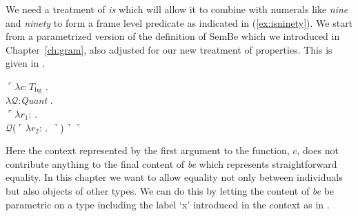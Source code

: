 We need a treatment of \textit{is} which will allow it to
combine with numerals like \textit{nine} and \textit{ninety} to form a
frame level predicate as indicated in (\ref{ex:isninety}).  We start
from a parametrized version of the definition of SemBe which we
introduced in Chapter~\ref{ch:gram}, also adjusted for our new
treatment of properties.  This is given in
\nexteg{}. 
\begin{ex}
$\ulcorner\lambda c:T_{\text{bg}}$ . \\
        \hspace*{1em}$\lambda\mathcal{Q}$:\textit{Quant} . \\
\hspace*{2em} $\ulcorner\lambda r_1$:
. \\
\hspace*{3em} $\mathcal{Q}$($\ulcorner\lambda
r_2$:
. $\urcorner$)$\urcorner\urcorner$ 
 
\end{ex} 
Here the context represented by the first argument to the function,
$c$, does not contribute anything to the final content of \textit{be}
which represents straightforward equality.  In this chapter we want to
allow equality not only between individuals but also objects of other
types.  We can do this by letting the content of \textit{be} be
parametric on a type including the label `x' introduced in the context as in \nexteg{}.
